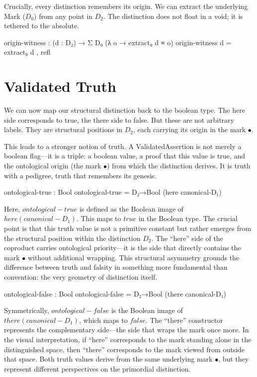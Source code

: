 \documentclass[11pt,a4paper]{book}
\def\texttt#1{#1}%
\def\text#1{#1}%
\begin{document}
Crucially, every distinction remembers its origin. We can extract the underlying Mark ($D_0$) from any point in $D_2$. The distinction does not float in a void; it is tethered to the absolute.

\begin{code}
origin-witness : (d : D₂) → Σ D₀ (λ o → extract₀ d ≡ o)
origin-witness d = extract₀ d , refl
\end{code}

\section{Validated Truth}

We can now map our structural distinction back to the boolean type. The \texttt{here} 
side corresponds to \texttt{true}, the \texttt{there} side to \texttt{false}. But 
these are not arbitrary labels. They are structural positions in $D_2$, each carrying 
its origin in the mark $\bullet$.

This leads to a stronger notion of truth. A \texttt{ValidatedAssertion} is not merely 
a boolean flag—it is a triple: a boolean value, a proof that this value is 
\texttt{true}, and the ontological origin (the mark $\bullet$) from which the 
distinction derives. It is truth with a pedigree, truth that remembers its genesis.

\begin{code}
ontological-true : Bool
ontological-true = D₂→Bool (here canonical-D₁)
\end{code}

Here, $\text{ontological-true}$ is defined as the Boolean image of $\text{here}(\text{canonical-}D_1)$. 
This maps to $\texttt{true}$ in the Boolean type. The crucial point is that this truth value is not a primitive constant but rather emerges from the structural position within the distinction $D_2$. The ``here'' side of the coproduct carries ontological priority—it is the side that directly contains the mark $\bullet$ without additional wrapping. This structural asymmetry grounds the difference between truth and falsity in something more fundamental than convention: the very geometry of distinction itself.

\begin{code}
ontological-false : Bool
ontological-false = D₂→Bool (there canonical-D₁)
\end{code}

Symmetrically, $\text{ontological-false}$ is the Boolean image of $\text{there}(\text{canonical-}D_1)$, 
which maps to $\texttt{false}$. The ``there'' constructor represents the complementary side—the side that wraps the mark once more. In the visual interpretation, if ``here'' corresponds to the mark standing alone in the distinguished space, then ``there'' corresponds to the mark viewed from outside that space. Both truth values derive from the same underlying mark $\bullet$, but they represent different perspectives on the primordial distinction.
\end{document}
